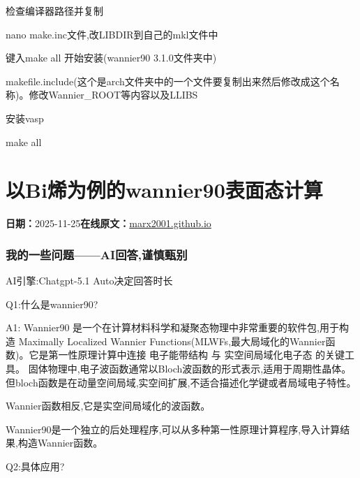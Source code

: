 \documentclass[lang=cn,scheme=chinese,color=blue,device=normal,toc=onecol,math=cm]{elegantbook}
\begin{document}
检查编译器路径并复制\par


nano make.inc文件,改LIBDIR到自己的mkl文件中\par


键入make all 开始安装(wannier90 3.1.0文件夹中)\par


makefile.include(这个是arch文件夹中的一个文件要复制出来然后修改成这个名称)。修改Wannier\_\allowbreak{}ROOT等内容以及LLIBS\par


安装vasp\par


make all\par



\section{以Bi烯为例的wannier90表面态计算}
\begin{articlemeta}
\textbf{日期：}2025-11-25\hfill\textbf{在线原文：}\href{https://marx2001.github.io/sci-note\_posts/20251125-wannier90-mrx}{marx2001.github.io}
\end{articlemeta}

\subsubsection{我的一些问题——AI回答,谨慎甄别}


AI引擎:Chatgpt-5.1 Auto决定回答时长\par


Q1:什么是wannier90?\par


A1: Wannier90 是一个在计算材料科学和凝聚态物理中非常重要的软件包,用于构造 Maximally Localized Wannier Functions(MLWFs,最大局域化的Wannier函数)。它是第一性原理计算中连接 电子能带结构 与 实空间局域化电子态 的关键工具。 固体物理中,电子波函数通常以Bloch波函数的形式表示,适用于周期性晶体。但bloch函数是在动量空间局域,实空间扩展,不适合描述化学键或者局域电子特性。\par


Wannier函数相反,它是实空间局域化的波函数。\par


Wannier90是一个独立的后处理程序,可以从多种第一性原理计算程序,导入计算结果,构造Wannier函数。\par


Q2:具体应用?\par
\end{document}
